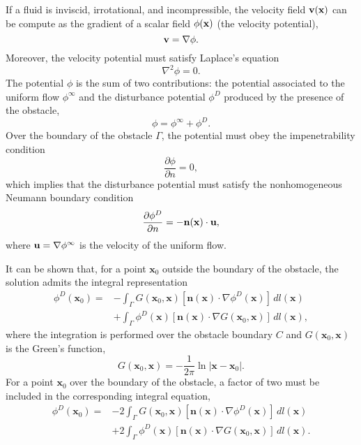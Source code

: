 \documentclass[11pt]{article}
\begin{document}
If a fluid is inviscid, irrotational, and incompressible, the velocity field ${\bf v}({\bf x})$ can be compute as the gradient of a scalar field $\phi({\bf x})$ (the velocity potential),
\begin{equation}
  \label{eq:1}
  {\bf v} = \nabla\phi.
\end{equation}
Moreover, the velocity potential must satisfy Laplace's equation
\begin{equation}
  \label{eq:2}
  \nabla^2\phi = 0.
\end{equation}
The potential $\phi$ is the sum of two contributions: the potential associated to the uniform flow $\phi^\infty$ and the disturbance potential $\phi^D$ produced by the presence of the obstacle,
\begin{equation}
  \label{eq:3}
  \phi = \phi^\infty + \phi^D.
\end{equation}
Over the boundary of the obstacle $\Gamma$, the potential must obey the impenetrability condition
\begin{equation}
  \label{eq:4}
  \frac{\partial\phi}{\partial n} = 0,
\end{equation}
which implies that the disturbance potential must satisfy the nonhomogeneous Neumann boundary condition
\begin{equation}
  \label{eq:5}
  \frac{\partial\phi^D}{\partial n} = -\mathbf{n}(\mathbf{x})\cdot{\bf u},
\end{equation}
where ${\bf u} = \nabla\phi^\infty$ is the velocity of the uniform flow.

It can be shown \cite{pozrikidis2002practical} that, for a point $\mathbf{x}_0$ outside the boundary of the obstacle, the solution admits the integral representation
\begin{align}
\phi^{D}(\mathbf{x}_0) = 
& - \int_{\Gamma} G(\mathbf{x}_0, \mathbf{x}) 
\left[ \mathbf{n}(\mathbf{x}) \cdot \nabla \phi^{D}(\mathbf{x}) \right] \, dl(\mathbf{x}) \nonumber \\
& + \int_{\Gamma} \phi^{D}(\mathbf{x}) 
\left[ \mathbf{n}(\mathbf{x}) \cdot \nabla G(\mathbf{x}_0, \mathbf{x}) \right] \, dl(\mathbf{x}) ,\label{eq:6}
\end{align}
where the integration is performed over the obstacle boundary $C$ and $G(\mathbf{x}_0,\mathbf{x})$ is the Green's function,
  \begin{equation}
    \label{eq:7}
   G(\mathbf{x}_0,\mathbf{x}) = -\frac{1}{2\pi}\ln{|\mathbf{x}-\mathbf{x}_0|}.
  \end{equation}
  For a point $\mathbf{x}_0$ over the boundary of the obstacle, a factor of two must be included in the corresponding integral equation,
  \begin{align}
\phi^{D}(\mathbf{x}_0) = 
& - 2\int_{\Gamma} G(\mathbf{x}_0, \mathbf{x}) 
\left[ \mathbf{n}(\mathbf{x}) \cdot \nabla \phi^{D}(\mathbf{x}) \right] \, dl(\mathbf{x}) \nonumber \\
& + 2\int_{\Gamma} \phi^{D}(\mathbf{x}) 
\left[ \mathbf{n}(\mathbf{x}) \cdot \nabla G(\mathbf{x}_0, \mathbf{x}) \right] \, dl(\mathbf{x})\label{eq:7}.  \end{align}
\end{document}
